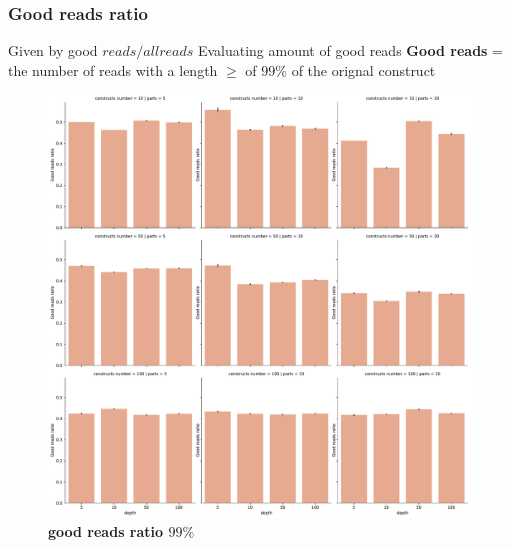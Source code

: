 \documentclass[11pt, a4paper]{article}
\begin{document}
\subsubsection{Good reads ratio}
Given by good $reads / all reads$
Evaluating amount of good reads
\textbf{Good reads} = the number of reads with a length $\geq$ of $99\%$ of the orignal construct

\begin{figure}[ht]
    \begin{center}
    \includegraphics[width=1\textwidth]{../results/images_notebook/v_322/99_good_reads_ratio.pdf}
    \end{center}
    \caption{{\bf good reads ratio $99\%$}}
   \label{fig:v_322_good_reads_ratio_99}
\end{figure}
\end{document}
